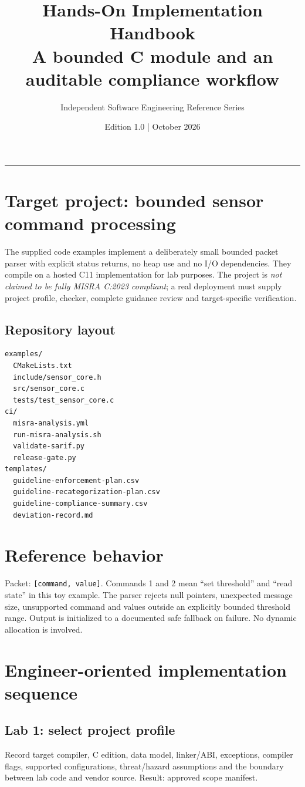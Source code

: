 \documentclass[10pt,letterpaper]{article}
\title{\vspace{-2.3em}\color{DeepNavy}\Huge\bfseries Hands-On Implementation Handbook\\[0.45em]\large\normalfont\color{Teal} A bounded C module and an auditable compliance workflow}
\author{Independent Software Engineering Reference Series}
\date{Edition 1.0 \quad | \quad October 2026}
\begin{document}
\maketitle
\vspace{-0.4em}
\begin{center}\color{Slate}\rule{0.83\linewidth}{0.4pt}\end{center}
\DocNotes
\tableofcontents
\newpage

\section{Target project: bounded sensor command processing}
The supplied code examples implement a deliberately small bounded packet parser with explicit status returns, no heap use and no I/O dependencies. They compile on a hosted C11 implementation for lab purposes. The project is \emph{not claimed to be fully MISRA C:2023 compliant}; a real deployment must supply project profile, checker, complete guidance review and target-specific verification.
\subsection{Repository layout}
\begin{lstlisting}[style=plaincode]
examples/
  CMakeLists.txt
  include/sensor_core.h
  src/sensor_core.c
  tests/test_sensor_core.c
ci/
  misra-analysis.yml
  run-misra-analysis.sh
  validate-sarif.py
  release-gate.py
templates/
  guideline-enforcement-plan.csv
  guideline-recategorization-plan.csv
  guideline-compliance-summary.csv
  deviation-record.md
\end{lstlisting}
\section{Reference behavior}
Packet: \texttt{[command, value]}. Commands 1 and 2 mean ``set threshold'' and ``read state'' in this toy example. The parser rejects null pointers, unexpected message size, unsupported command and values outside an explicitly bounded threshold range. Output is initialized to a documented safe fallback on failure. No dynamic allocation is involved.
\section{Engineer-oriented implementation sequence}
\subsection{Lab 1: select project profile}
Record target compiler, C edition, data model, linker/ABI, exceptions, compiler flags, supported configurations, threat/hazard assumptions and the boundary between lab code and vendor source. Result: approved scope manifest.
\end{document}
